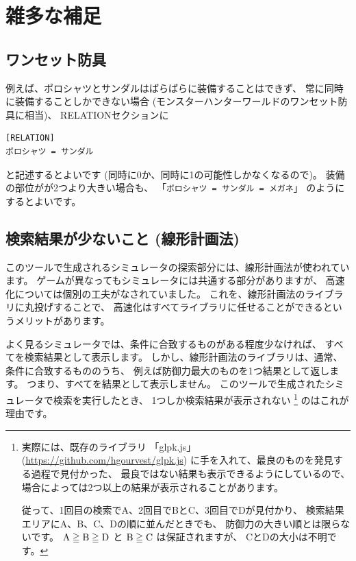 \documentclass[dvipdfmx]{jsarticle}
\begin{document}
\section{雑多な補足} %

\subsection{ワンセット防具}
例えば、ポロシャツとサンダルはばらばらに装備することはできず、
常に同時に装備することしかできない場合
(モンスターハンターワールドのワンセット防具に相当)、
RELATIONセクションに
\medskip
\\
{\footnotesize\begin{mdframed}\begin{Verbatim}[commandchars=!<>]
[RELATION]
ポロシャツ = サンダル
\end{Verbatim}
\end{mdframed}}
\medskip
\noindent
と記述するとよいです (同時に0か、同時に1の可能性しかなくなるので)。
装備の部位がが2つより大きい場合も、
「\texttt{ポロシャツ = サンダル = メガネ}」
のようにするとよいです。

\subsection{検索結果が少ないこと (線形計画法)}
このツールで生成されるシミュレータの探索部分には、線形計画法が使われています。
ゲームが異なってもシミュレータには共通する部分がありますが、
高速化については個別の工夫がなされていました。
これを、線形計画法のライブラリに丸投げすることで、
高速化はすべてライブラリに任せることができるというメリットがあります。

よく見るシミュレータでは、条件に合致するものがある程度少なければ、
すべてを検索結果として表示します。
しかし、線形計画法のライブラリは、通常、条件に合致するもののうち、
例えば防御力最大のものを1つ結果として返します。
つまり、すべてを結果として表示しません。
このツールで生成されたシミュレータで検索を実行したとき、
1つしか検索結果が表示されない%
\footnote{
実際には、既存のライブラリ
「glpk.js」(\url{https://github.com/hgourvest/glpk.js})
に手を入れて、最良のものを発見する過程で見付かった、
最良ではない結果も表示できるようにしているので、
場合によっては2つ以上の結果が表示されることがあります。
\par
従って、1回目の検索でA、2回目でBとC、3回目でDが見付かり、
検索結果エリアにA、B、C、Dの順に並んだときでも、
防御力の大きい順とは限らないです。
$\rm{A} \geqq \rm{B} \geqq \rm{D}$ と
$\rm{B} \geqq \rm{C}$ は保証されますが、
CとDの大小は不明です。
}%
のはこれが理由です。
\end{document}
